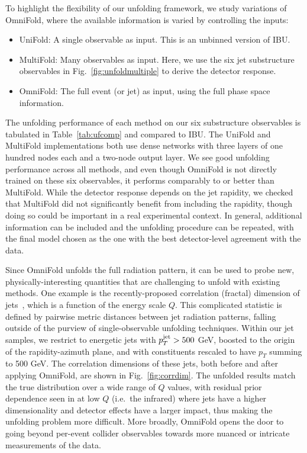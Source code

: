 \documentclass[prl,twocolumn,superscriptaddress,longbibliography,preprintnumbers,nofootinbib]{revtex4-1}
\DeclareRobustCommand{\Tab}[1]{Table~\ref{tab:#1}}
\DeclareRobustCommand{\Fig}[1]{Fig.~\ref{fig:#1}}
\newcommand{\OmniFold}{{\sc OmniFold}\xspace}
\newcommand{\MultiFold}{{\sc MultiFold}\xspace}
\newcommand{\UniFold}{{\sc UniFold}\xspace}
\begin{document}
To highlight the flexibility of our unfolding framework, we study variations of \OmniFold, where the available information is varied by controlling the inputs:
\begin{itemize}
    \item \UniFold: A single observable as input.  This is an unbinned version of IBU.
    \item \MultiFold: Many observables as input.  Here, we use the six jet substructure observables in \Fig{unfoldmultiple} to derive the detector response.
    \item \OmniFold: The full event (or jet) as input, using the full phase space information.
\end{itemize}
%
The unfolding performance of each method on our six substructure observables is tabulated in \Tab{ufcomp} and compared to IBU.
%
The \UniFold and \MultiFold implementations both use dense networks with three layers of one hundred nodes each and a two-node output layer.
%
We see good unfolding performance across all methods, and even though \OmniFold is not directly trained on these six observables, it performs comparably to or better than \MultiFold.
%
While the detector response depends on the jet rapidity, we checked that \MultiFold did not significantly benefit from including the rapidity, though doing so could be important in a real experimental context.
%
In general, additional information can be included and the unfolding procedure can be repeated, with the final model chosen as the one with the best detector-level agreement with the data.


%
Since \OmniFold unfolds the full radiation pattern, it can be used to probe new, physically-interesting quantities that are challenging to unfold with existing methods.
%
One example is the recently-proposed correlation (fractal) dimension of jets~\cite{Komiske:2019fks,Komiske:2019jim}, which is a function of the energy scale $Q$.
%
This complicated statistic is defined by pairwise metric distances between jet radiation patterns, falling outside of the purview of single-observable unfolding techniques.
%
Within our jet samples, we restrict to energetic jets with $p_T^{\rm{jet}}>500$ GeV, boosted to the origin of the rapidity-azimuth plane, and with constituents rescaled to have $p_T$ summing to 500 GeV.
%
The correlation dimensions of these jets, both before and after applying \OmniFold, are shown in \Fig{corrdim}.
%
The unfolded results match the true distribution over a wide range of $Q$ values, with residual prior dependence seen in at low $Q$ (i.e.\ the infrared) where jets have a higher dimensionality and detector effects have a larger impact,  thus making the unfolding problem more difficult.
%
More broadly, \OmniFold opens the door to going beyond per-event collider observables towards more nuanced or intricate measurements of the data.
\end{document}
